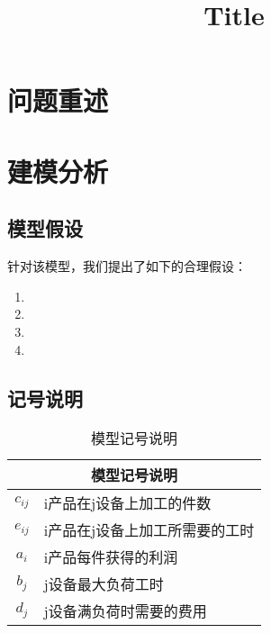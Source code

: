 \documentclass{cumcmart}
\begin{document}


\title{Title}

\maketitle

\begin{cnabstract}%


\end{cnabstract}

\newpage


\section{问题重述}


\section{建模分析}

\subsection{模型假设}
针对该模型，我们提出了如下的合理假设：
\begin{enumerate}
\item 
\item 
\item 
\item 
\end{enumerate}

\subsection{记号说明}
\begin{table}[!htbp]
    \centering
    \begin{tabular}{cl}
    \toprule
    \multicolumn{2}{c}{\large 模型记号说明}\\
    \midrule
    ${c_{ij}}$ &  i产品在j设备上加工的件数 \\
    ${e_{ij}}$ &  i产品在j设备上加工所需要的工时 \\
    ${a_i}$    &  i产品每件获得的利润 \\
    ${b_j}$    &  j设备最大负荷工时 \\
    ${d_j}$    &  j设备满负荷时需要的费用 \\
    \bottomrule
    \end{tabular}
    \caption{模型记号说明}
\end{table}
\end{document}
